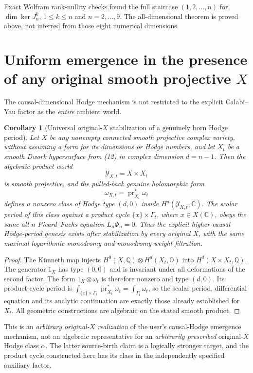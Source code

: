 \documentclass[11pt]{article}
\newtheorem{corollary}{Corollary}
\begin{document}
Exact Wolfram rank-nullity checks found the full
staircase $(1,2,\ldots,n)$ for
$\dim\ker J_n^k$, $1\le k\le n$ and $n=2,\ldots,9$.
The all-dimensional theorem is proved above, not
inferred from those eight numerical dimensions.


\section{Uniform emergence in the presence of any original smooth projective $X$}

The causal-dimensional Hodge mechanism is not restricted to the
explicit Calabi--Yau factor as the \emph{entire} ambient world.

\begin{corollary}[Universal original-$X$ stabilization of a genuinely born
Hodge period]
Let $X$ be any nonempty connected smooth projective complex
variety, without assuming a form for its dimensions or Hodge
numbers, and let $X_t$ be a smooth Dwork hypersurface from
(12) in complex dimension $d=n-1$.
Then the algebraic product world
\[
  \mathscr Y_{X,t}=X\times X_t
\]
is smooth projective, and the pulled-back genuine
holomorphic form
\[
  \omega_{X,t}=\operatorname{pr}_{X_t}^*\omega_t
\]
defines a nonzero class of Hodge type $(d,0)$ inside
$H^d(\mathscr Y_{X,t},\mathbb C)$.
The scalar period of this class against a product cycle
$\{x\}\times\Gamma_t$, where $x\in X(\mathbb C)$,
obeys the same all-$n$ Picard--Fuchs equation
$L_n\Phi_n=0$.
Thus the explicit higher-causal Hodge-period genesis
exists after stabilization by \emph{every} original $X$,
with the same maximal logarithmic monodromy
and monodromy-weight filtration.
\end{corollary}
\begin{proof}
The K\"unneth map injects
$H^0(X,\mathbb Q)\otimes H^d(X_t,\mathbb Q)$
into $H^d(X\times X_t,\mathbb Q)$.
The generator $1_X$ has type $(0,0)$
and is invariant under all deformations of the second
factor. The form $1_X\otimes\omega_t$
is therefore nonzero and type $(d,0)$.
Its product-cycle period is
$\int_{\{x\}\times\Gamma_t}
\operatorname{pr}_{X_t}^*\omega_t
=\int_{\Gamma_t}\omega_t$, so the scalar period,
differential equation and its analytic continuation
are exactly those already established for $X_t$.
All geometric constructions are algebraic on
the stated smooth product.
\end{proof}

This is an \emph{arbitrary original-$X$ realization}
of the user's causal-Hodge emergence mechanism,
not an algebraic representative for an
\emph{arbitrarily prescribed} original-$X$
Hodge class $\alpha$. The latter source-birth
claim is a logically stronger target, and the
product cycle constructed here has its class
in the independently specified auxiliary factor.
\end{document}
